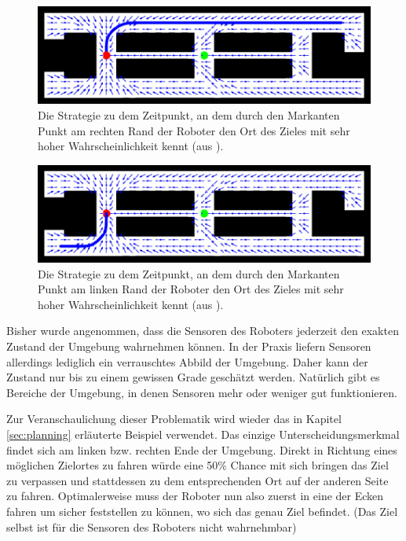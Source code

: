 \documentclass[a4paper]{IEEEtran}
\begin{document}
\begin{figure}[ht]
	\centering
	\includegraphics[scale=0.72]{images/autnmRobot_POMDPPathB.png}
	\caption{Die Strategie zu dem Zeitpunkt, an dem durch den Markanten Punkt am rechten Rand der Roboter den Ort des Zieles mit sehr hoher Wahrscheinlichkeit kennt (aus \cite{thrun2005probabilistic}).}
	\label{autnmRobot_POMDPPathB}
\end{figure}

\begin{figure}[ht]
	\centering
	\includegraphics[scale=0.72]{images/autnmRobot_POMDPPathC.png}
	\caption{Die Strategie zu dem Zeitpunkt, an dem durch den Markanten Punkt am linken Rand der Roboter den Ort des Zieles mit sehr hoher Wahrscheinlichkeit kennt (aus \cite{thrun2005probabilistic}).}
	\label{autnmRobot_POMDPPathC}
\end{figure}

Bisher wurde angenommen, dass die Sensoren des Roboters jederzeit den exakten Zustand der Umgebung wahrnehmen können. In der Praxis liefern Sensoren allerdings lediglich ein verrauschtes Abbild der Umgebung. Daher kann der Zustand nur bis zu einem gewissen Grade geschätzt werden. Natürlich gibt es Bereiche der Umgebung, in denen Sensoren mehr oder weniger gut funktionieren.

Zur Veranschaulichung dieser Problematik wird wieder das in Kapitel \ref{sec:planning} erläuterte Beispiel verwendet. Das einzige Unterscheidungsmerkmal findet sich am linken bzw. rechten Ende der Umgebung. Direkt in Richtung eines möglichen Zielortes zu fahren würde eine 50\% Chance mit sich bringen das Ziel zu verpassen und stattdessen zu dem entsprechenden Ort auf der anderen Seite zu fahren. Optimalerweise muss der Roboter nun also zuerst in eine der Ecken fahren um sicher feststellen zu können, wo sich das genau Ziel befindet. (Das Ziel selbst ist für die Sensoren des Roboters nicht wahrnehmbar)
\end{document}
